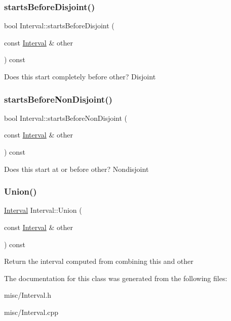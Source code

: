 \subsubsection{\texorpdfstring{starts\+Before\+Disjoint()}{startsBeforeDisjoint()}}
{\footnotesize\ttfamily bool Interval\+::starts\+Before\+Disjoint (\begin{DoxyParamCaption}\item[{const \hyperlink{classantlr4_1_1misc_1_1Interval}{Interval} \&}]{other }\end{DoxyParamCaption}) const}



Does this start completely before other? Disjoint 

\mbox{\label{classantlr4_1_1misc_1_1Interval_a2d716ddeb5c7691092d855e7db3d1a73}} 
\subsubsection{\texorpdfstring{starts\+Before\+Non\+Disjoint()}{startsBeforeNonDisjoint()}}
{\footnotesize\ttfamily bool Interval\+::starts\+Before\+Non\+Disjoint (\begin{DoxyParamCaption}\item[{const \hyperlink{classantlr4_1_1misc_1_1Interval}{Interval} \&}]{other }\end{DoxyParamCaption}) const}



Does this start at or before other? Nondisjoint 

\mbox{\label{classantlr4_1_1misc_1_1Interval_a4bb5a05fa042422c5b3d2389a27288c4}} 
\subsubsection{\texorpdfstring{Union()}{Union()}}
{\footnotesize\ttfamily \hyperlink{classantlr4_1_1misc_1_1Interval}{Interval} Interval\+::\+Union (\begin{DoxyParamCaption}\item[{const \hyperlink{classantlr4_1_1misc_1_1Interval}{Interval} \&}]{other }\end{DoxyParamCaption}) const}



Return the interval computed from combining this and other 



The documentation for this class was generated from the following files\+:\begin{DoxyCompactItemize}
\item 
misc/Interval.\+h\item 
misc/Interval.\+cpp\end{DoxyCompactItemize}
